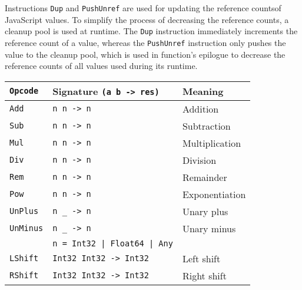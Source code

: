 Instructions \texttt{Dup} and \texttt{PushUnref} are used for updating the reference counts\footnotemark[1] of JavaScript values. To simplify the process of decreasing the reference counts, a cleanup pool is used at runtime. The \texttt{Dup} instruction immediately increments the reference count of a value, whereas the \texttt{PushUnref} instruction only pushes the value to the cleanup pool, which is used in function's epilogue to decrease the reference counts of all values used during its runtime.



\begin{table}
    \centering
    \begin{tabular}{l | l | l}
        \texttt{Opcode}      & Signature \texttt{(a b -> res)}    &  Meaning                    \\\hline
        \texttt{Add}         & \texttt{n      n     -> n        } &  Addition                   \\
        \texttt{Sub}         & \texttt{n      n     -> n        } &  Subtraction                \\
        \texttt{Mul}         & \texttt{n      n     -> n        } &  Multiplication             \\
        \texttt{Div}         & \texttt{n      n     -> n        } &  Division                   \\
        \texttt{Rem}         & \texttt{n      n     -> n        } &  Remainder                  \\
        \texttt{Pow}         & \texttt{n      n     -> n        } &  Exponentiation             \\
        \texttt{UnPlus}      & \texttt{n      \_    -> n        } &  Unary plus                 \\
        \texttt{UnMinus}     & \texttt{n      \_    -> n        } &  Unary minus                \\
                             & \texttt{n = Int32 | Float64 | Any} &                             \\\hline
        \texttt{LShift}      & \texttt{Int32  Int32 -> Int32    } &  Left shift                 \\
        \texttt{RShift}      & \texttt{Int32  Int32 -> Int32    } &  Right shift                \\

\end{tabular}
\end{table}
